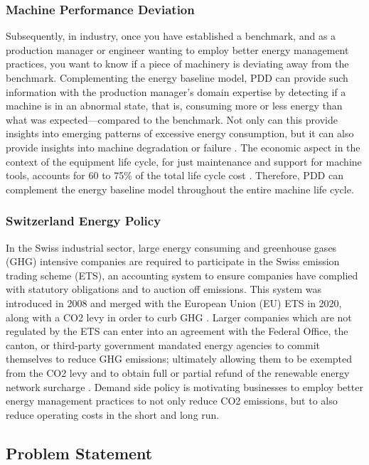 \subsubsection{Machine Performance Deviation}

Subsequently, in industry, once you have established a benchmark, and as a production manager or engineer wanting to employ better energy management practices, you want to know if a piece of machinery is deviating away from the benchmark. Complementing the energy baseline model, PDD can provide such information with the production manager's domain expertise by detecting if a machine is in an abnormal state, that is, consuming more or less energy than what was expected—compared to the benchmark. Not only can this provide insights into emerging patterns of excessive energy consumption, but it can also provide insights into machine degradation or failure \cite{online-fault-monitoring}. The economic aspect in the context of the equipment life cycle, for just maintenance and support for machine tools, accounts for 60 to 75\% of the total life cycle cost \cite{econ-costs}. Therefore, PDD can complement the energy baseline model throughout the entire machine life cycle.

\subsubsection{Switzerland Energy Policy}
In the Swiss industrial sector, large energy consuming and greenhouse gases (GHG) intensive companies are required to participate in the Swiss emission trading scheme (ETS), an accounting system to ensure companies have complied with statutory obligations and to auction off emissions. This system was introduced in 2008 and merged with the European Union (EU) ETS in 2020, along with a CO2 levy in order to curb GHG \cite{carbon_trading}. Larger companies which are not regulated by the ETS can enter into an agreement with the Federal Office, the canton, or third-party government mandated energy agencies to commit themselves to reduce GHG emissions; ultimately allowing them to be exempted from the CO2 levy and to obtain full or partial refund of the renewable energy network surcharge \cite{optional}. Demand side policy is motivating businesses to employ better energy management practices to not only reduce CO2 emissions, but to also reduce operating costs in the short and long run. 

\subsection{Problem Statement}

